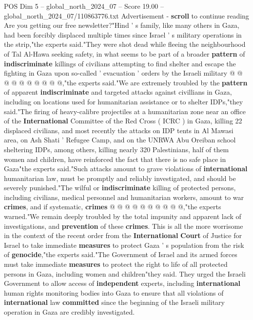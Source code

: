 \begin{textsample}{POS Dim 5 – global\_north\_2024\_07 – Score 19.00 – global\_north\_2024\_07/110863776.txt}
Advertisement - \textbf{scroll} to continue reading Are you getting our free newsletter?"Hind ' s family, like many others in Gaza, had been forcibly displaced multiple times since Israel ' s military operations in the strip,"the experts said."They were shot dead while fleeing the neighbourhood of Tal Al-Hawa seeking safety, in what seems to be part of a broader \textbf{pattern} of \textbf{indiscriminate} killings of civilians attempting to find shelter and escape the fighting in Gaza upon so-called ' evacuation ' orders by the Israeli military @ @ @ @ @ @ @ @ @ @,"the experts said."We are extremely troubled by the \textbf{pattern} of apparent \textbf{indiscriminate} and targeted attacks against civillians in Gaza, including on locations used for humanitarian assistance or to shelter IDPs,"they said."The firing of heavy-calibre projectiles at a humanitarian zone near an office of the \textbf{International} Committee of the Red Cross ( ICRC ) in Gaza, killing 22 displaced civilians, and most recently the attacks on IDP tents in Al Mawasi area, on Ash Shati ' Refugee Camp, and on the UNRWA Abu Oreiban school sheltering IDPs, among others, killing nearly 320 Palestinians, half of them women and children, have reinforced the fact that there is no safe place in Gaza"the experts said."Such attacks amount to grave violations of \textbf{international} humanitarian law, must be promptly and reliably investigated, and should be severely punished."The wilful or \textbf{indiscriminate} killing of protected persons, including civilians, medical personnel and humanitarian workers, amount to war \textbf{crimes}, and if systematic, \textbf{crimes} @ @ @ @ @ @ @ @ @ @,"the experts warned."We remain deeply troubled by the total impunity and apparent lack of investigations, and \textbf{prevention} of these \textbf{crimes}.
This is all the more worrisome in the context of the recent order from the \textbf{International} \textbf{Court} of Justice for Israel to take immediate \textbf{measures} to protect Gaza ' s population from the risk of \textbf{genocide},"the experts said."The Government of Israel and its armed forces must take immediate \textbf{measures} to protect the right to life of all protected persons in Gaza, including women and children"they said.
They urged the Israeli Government to allow access of \textbf{independent} experts, including \textbf{international} human rights monitoring bodies into Gaza to ensure that all violations of \textbf{international} law \textbf{committed} since the beginning of the Israeli military operation in Gaza are credibly investigated.

\end{textsample}
